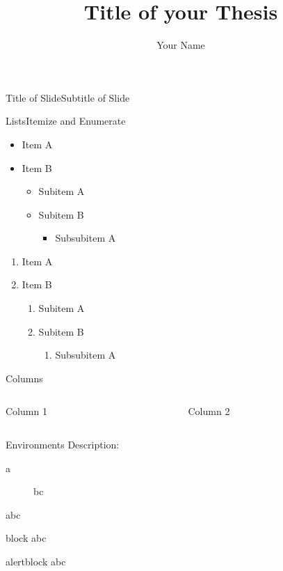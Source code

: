 \documentclass[RAIbeamer%
               ,optBiber%
               ,optBibstyleAlphabetic%
               ,optBeamerClassicFormat%
               ]{RAIlatex}%
\title[Short-Title]{Title of your Thesis}%
\author[Short-Name]{Your Name}%
\date{\RAIutilsDate{1}{1}{2017}}%
\begin{document}
%
%
\RAIbeamerTitlePageStudentThesis%
%
\begin{frame}{Title of Slide}{Subtitle of Slide}%
    \blindtext%
\end{frame}%
%
%
%
\begin{frame}{Lists}{Itemize and Enumerate}%
    \begin{itemize}
        \item Item A
        \item Item B
        \begin{itemize}
            \item Subitem A
            \item Subitem B
            \begin{itemize}
                \item Subsubitem A
            \end{itemize}
        \end{itemize}
    \end{itemize}
    \begin{enumerate}
        \item Item A
        \item Item B
        \begin{enumerate}
            \item Subitem A
            \item Subitem B
            \begin{enumerate}
                \item Subsubitem A
            \end{enumerate}
        \end{enumerate}
    \end{enumerate}
\end{frame}%
%
\begin{frame}{Columns}%
    \begin{columns}[T,onlytextwidth]%
        \begin{column}[T]{0.48\textwidth}%
            Column 1%
        \end{column}%
        \begin{column}[T]{0.48\textwidth}%
            Column 2%
        \end{column}%
    \end{columns}%
\end{frame}%
%
\begin{frame}{Environments}%
    Description:%
    \begin{description}%
      \item [a] bc%
    \end{description}%
    \begin{theorem}%
      abc%
    \end{theorem}%
    \begin{block}{block}%
      abc%
    \end{block}%
    \begin{alertblock}{alertblock}%
      abc%
    \end{alertblock}%
\end{frame}%
\end{document}
